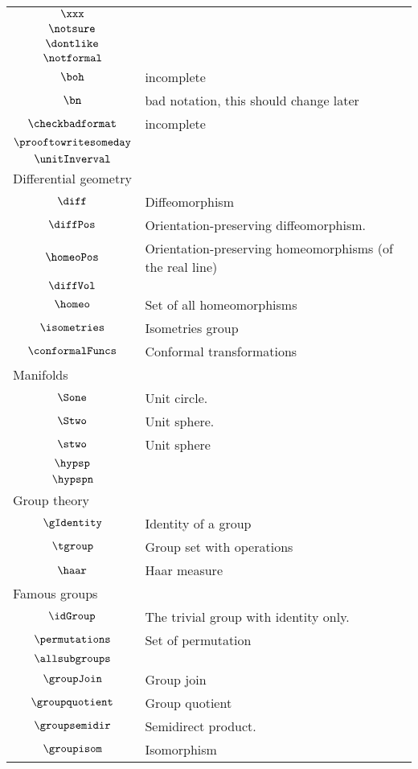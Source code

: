 \begin{longtable}{cl}
 $\xxx$ & \\ 
 $\notsure$ & \\ 
 $\dontlike$ & \\ 
 $\notformal$ & \\ 
 $\boh$ &  incomplete\\ 
 $\bn$ &  bad notation, this should change later\\ 
 $\checkbadformat$ &  incomplete\\ 
 $\prooftowritesomeday$ & \\ 
 $\unitInverval$ & \\ 
 \multicolumn{2}{l}{Differential geometry}\\ 
 \hline
$\diff$ &  Diffeomorphism\\ 
 $\diffPos$ &  Orientation-preserving diffeomorphism.\\ 
 $\homeoPos$ &  Orientation-preserving homeomorphisms (of the real line)\\ 
 $\diffVol$ & \\ 
 $\homeo$ &  Set of all homeomorphisms\\ 
 $\isometries$ &  Isometries group\\ 
 $\conformalFuncs$ &  Conformal transformations\\ 
 \multicolumn{2}{l}{Manifolds}\\ 
 \hline
$\Sone$ &  Unit circle.\\ 
 $\Stwo$ &  Unit sphere.\\ 
 $\stwo$ &  Unit sphere\\ 
 $\hypsp$ & \\ 
 $\hypspn$ & \\ 
 \multicolumn{2}{l}{Group theory}\\ 
 \hline
$\gIdentity$ &  Identity of a group\\ 
 $\tgroup$ &  Group set with operations\\ 
 $\haar$ &  Haar measure\\ 
 \multicolumn{2}{l}{Famous groups}\\ 
 \hline
$\idGroup$ &  The trivial group with identity only.\\ 
 $\permutations$ &  Set of permutation\\ 
 $\allsubgroups$ & \\ 
 $\groupJoin$ &  Group join\\ 
 $\groupquotient$ &  Group quotient\\ 
 $\groupsemidir$ &  Semidirect product.\\ 
 $\groupisom$ &  Isomorphism\\ 

\end{longtable}
